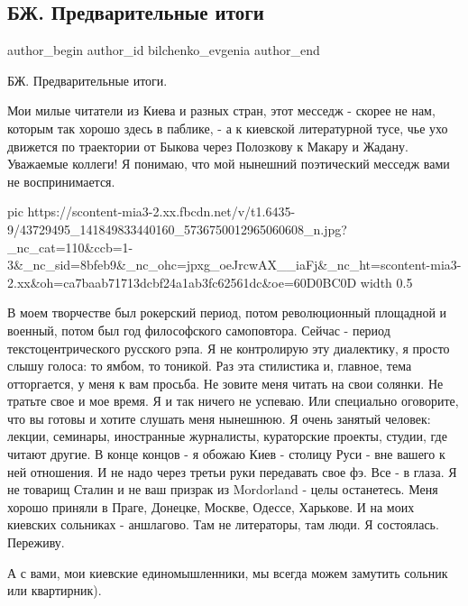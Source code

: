  
 
 
 
 
 
\subsection{БЖ. Предварительные итоги}
\label{sec:11_10_2018.fb.bilchenko_evgenia.1.itogi}
\ifcmt
 author_begin
   author_id bilchenko_evgenia
 author_end
\fi

БЖ. Предварительные итоги.

Мои милые читатели из Киева и разных стран, этот месседж - скорее не нам,
которым так хорошо здесь в паблике, - а к киевской  литературной тусе, чье ухо
движется по траектории от Быкова через Полозкову к Макару и Жадану. Уважаемые
коллеги! Я понимаю, что мой нынешний поэтический месседж вами не
воспринимается. 

\ifcmt
  pic https://scontent-mia3-2.xx.fbcdn.net/v/t1.6435-9/43729495_141849833440160_5736750012965060608_n.jpg?_nc_cat=110&ccb=1-3&_nc_sid=8bfeb9&_nc_ohc=jpxg_oeJrcwAX__iaFj&_nc_ht=scontent-mia3-2.xx&oh=ca7baab71713dcbf24a1ab3fc62561dc&oe=60D0BC0D
	width 0.5
\fi

В моем творчестве был рокерский период, потом революционный
площадной и военный, потом был год философского самоповтора. Сейчас - период
текстоцентрического русского рэпа. Я не контролирую эту диалектику, я просто
слышу голоса: то ямбом, то тоникой. Раз эта стилистика и, главное, тема
отторгается, у меня к вам просьба. Не зовите меня читать на свои солянки. Не
тратьте свое и мое время. Я и так ничего не успеваю. Или специально оговорите,
что вы готовы и хотите слушать меня нынешнюю. Я очень занятый человек: лекции,
семинары, иностранные журналисты, кураторские проекты, студии, где читают
другие. В конце концов - я обожаю Киев -  столицу Руси - вне вашего к ней
отношения. И не надо через третьи руки передавать свое фэ. Все  - в глаза. Я не
товарищ Сталин и не ваш призрак из Mordorland - целы останетесь. Меня хорошо
приняли в Праге, Донецке, Москве, Одессе, Харькове. И на моих киевских
сольниках - аншлагово.  Там не литераторы, там люди. Я состоялась. Переживу.

А с вами, мои киевские единомышленники, мы всегда можем замутить сольник или
квартирник).

